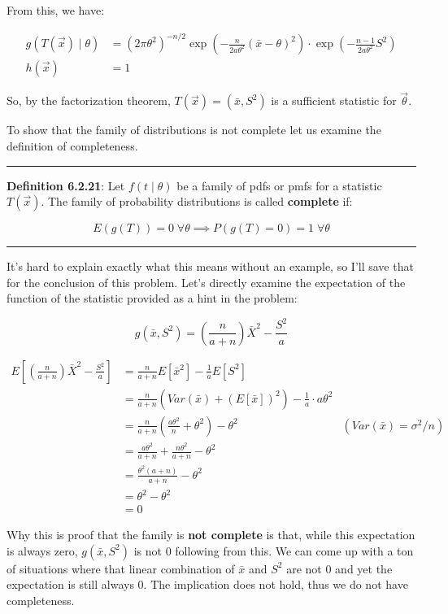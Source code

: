 From this, we have:

\vspace{-3mm}
\begin{align*}
	g(T(\vec{x}) \mid \theta) &= (2\pi \theta^2)^{-n/2} \exp\left( -\frac{n}{2a\theta^2} (\bar{x} - \theta)^2 \right) \cdot \exp\left( -\frac{n-1}{2a\theta^2} S^2 \right) \\
	h(\vec{x}) &= 1
\end{align*}

So, by the factorization theorem, $T(\vec{x}) = (\bar{x}, S^2)$ is a sufficient statistic for $\vec{\theta}$.

To show that the family of distributions is not complete let us examine the definition of completeness.

\vspace{3mm}
\hrule
\vspace{3mm}

\textbf{Definition 6.2.21}: Let $f(t\mid\theta)$ be a family of pdfs or pmfs for a statistic $T(\vec{x})$. The family of probability distributions is called \textbf{complete} if:

\[E(g(T)) = 0 \; \forall \theta \implies P(g(T) = 0) = 1 \; \forall \theta\]

\vspace{3mm}
\hrule
\vspace{3mm}

It's hard to explain exactly what this means without an example, so I'll save that for the conclusion of this problem. Let's directly examine the expectation of the function of the statistic provided as a hint in the problem:

\[g(\bar{x}, S^2) = \left( \frac{n}{a + n} \right) \bar{X}^2 - \frac{S^2}{a}\]

\vspace{-3mm}
\begin{align*}
	E\left[ \left( \frac{n}{a + n} \right) \bar{X}^2 - \frac{S^2}{a}  \right] &= \frac{n}{a+n} E[\bar{x}^2] - \frac{1}{a}E[S^2] \\
	&= \frac{n}{a+n} (Var(\bar{x}) + (E[\bar{x}])^2) - \frac{1}{a} \cdot a\theta^2 \\
	&= \frac{n}{a+n} \left( \frac{a\theta^2}{n} + \theta^2 \right) - \theta^2 & (Var(\bar{x}) = \sigma^2 / n) \\
	&= \frac{a\theta^2}{a+n} + \frac{n\theta^2}{a + n} - \theta^2 \\
	&= \frac{\theta^2(a+n)}{a+n} - \theta^2 \\
	&= \theta^2 - \theta^2 \\
	&= 0
\end{align*}

Why this is proof that the family is \textbf{not complete} is that, while this expectation is always zero, $g(\bar{x}, S^2)$ is not $0$ following from this. We can come up with a ton of situations where that linear combination of $\bar{x}$ and $S^2$ are not 0 and yet the expectation is still always 0. The implication does not hold, thus we do not have completeness.
